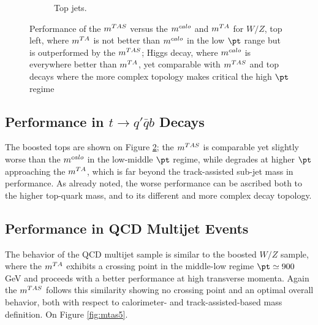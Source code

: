 \begin{figure}
\begin{subfigure}[b]{0.45\textwidth}
  \caption[$\mtas$ for boosted tops]{Top jets.}
  \label{fig:mtas3}
    \end{subfigure}%


    \caption[Performance of the $\mtas$ versus the $\mcal$ and $\mta$]{Performance of the $\mtas$ versus the $\mcal$ and $\mta$ for $W/Z$, top left, where $\mta$ is not better than $\mcal$ in the low $\pt$ range but is outperformed by the $\mtas$;  Higgs decay, where $\mcal$ is everywhere better than $\mta$, yet comparable with $\mtas$ and top decays where the more complex topology makes critical the high $\pt$ regime} 
\end{figure}


\subsection{Performance in $t\to q'\bar{q}b$ Decays}
The boosted tops are shown on Figure \ref{fig:mtas3}; the $\mtas$ is comparable yet slightly worse than the $\mcal$ in the low-middle $\pt$ regime, while degrades at higher $\pt$ approaching the $\mta$, which is far beyond the track-assisted sub-jet mass in performance.
As already noted, the worse performance can be ascribed both to the higher top-quark mass, and to its different and more complex decay topology.








\subsection{Performance in QCD Multijet Events}
The behavior of the QCD multijet sample is similar to the boosted $W/Z$ sample, where the $\mta$ exhibits a crossing point in the middle-low regime $\pt\simeq900$ GeV and proceeds with a better performance at high transverse momenta.
Again the $\mtas$ follows this similarity showing no crossing point and an optimal overall behavior, both with respect to calorimeter- and track-assisted-based mass definition. On Figure \ref{fig:mtas5}.

